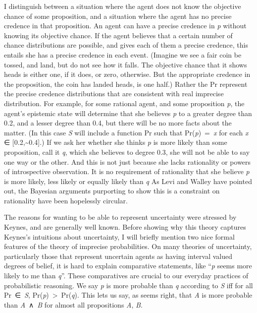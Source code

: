 \documentclass[
  10pt,
  letterpaper,
  DIV=11,
  numbers=noendperiod,
  twoside]{scrartcl}
\begin{document}
I distinguish between a situation where the agent does not know the
objective chance of some proposition, and a situation where the agent
has no precise credence in that proposition. An agent can have a precise
credence in \emph{p} without knowing its objective chance. If the agent
believes that a certain number of chance distributions are possible, and
gives each of them a precise credence, this entails she has a precise
credence in each event. (Imagine we see a fair coin be tossed, and land,
but do not see how it falls. The objective chance that it shows heads is
either one, if it does, or zero, otherwise. But the appropriate credence
in the proposition, the coin has landed heads, is one half.) Rather the
Pr represent the precise credence distributions that are consistent with
real imprecise distribution. For example, for some rational agent, and
some proposition \emph{p}, the agent's epistemic state will determine
that she believes \emph{p} to a greater degree than 0.2, and a lesser
degree than 0.4, but there will be no more facts about the matter. (In
this case \emph{S} will include a function Pr such that
Pr(\emph{p})~=~\emph{x} for each \emph{x} ∈
{[}0.2,\textasciitilde0.4{]}.) If we ask her whether she thinks \emph{p}
is more likely than some proposition, call it \emph{q}, which she
believes to degree 0.3, she will not be able to say one way or the
other. And this is not just because she lacks rationality or powers of
introspective observation. It is no requirement of rationality that she
believe \emph{p} is more likely, less likely or equally likely than
\emph{q} As Levi and Walley have pointed out, the Bayesian arguments
purporting to show this is a constraint on rationality have been
hopelessly circular.

The reasons for wanting to be able to represent uncertainty were
stressed by Keynes, and are generally well known. Before showing why
this theory captures Keynes's intuitions about uncertainty, I will
briefly mention two nice formal features of the theory of imprecise
probabilities. On many theories of uncertainty, particularly those that
represent uncertain agents as having interval valued degrees of belief,
it is hard to explain comparative statements, like ``\emph{p} seems more
likely to me than \emph{q}''. These comparatives are crucial to our
everyday practices of probabilistic reasoning. We say \emph{p} is more
probable than \emph{q} according to \emph{S} iff for all Pr~∈~\emph{S},
Pr(\emph{p})~\textgreater~Pr(\emph{q}). This lets us say, as seems
right, that \emph{A} is more probable than \emph{A}~∧~\emph{B} for
almost all propositions \emph{A}, \emph{B}.
\end{document}
